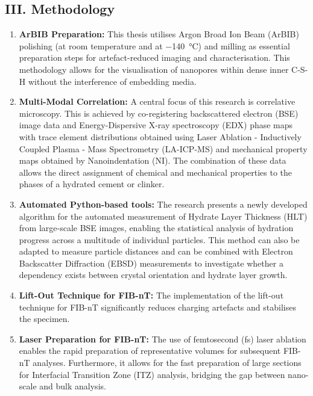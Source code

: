 \documentclass[11pt, a4paper]{article}
\begin{document}
\subsection*{III. Methodology}

\begin{enumerate}[label=\textbf{\arabic*.}, leftmargin=1.5cm, labelsep=0.5cm, itemsep=0.5em, resume]
    \item \textbf{ArBIB Preparation:} This thesis utilises Argon Broad Ion Beam (ArBIB) polishing (at room temperature and at \qty{-140}{\celsius}) and milling as essential preparation steps for artefact-reduced imaging and characterisation.
    This methodology allows for the visualisation of nanopores within dense inner C-S-H without the interference of embedding media.
    \item \textbf{Multi-Modal Correlation:} A central focus of this research is correlative microscopy.
    This is achieved by co-registering backscattered electron (BSE) image data and Energy-Dispersive X-ray spectroscopy (EDX) phase maps with trace element distributions obtained using Laser Ablation - Inductively Coupled Plasma - Mass Spectrometry (LA-ICP-MS) and mechanical property maps obtained by Nanoindentation (NI).
    The combination of these data allows the direct assignment of chemical and mechanical properties to the phases of a hydrated cement or clinker.
    \item \textbf{Automated Python-based tools:} The research presents a newly developed algorithm for the automated measurement of Hydrate Layer Thickness (HLT) from large-scale BSE images, enabling the statistical analysis of hydration progress across a multitude of individual particles.
    This method can also be adapted to measure particle distances and can be combined with Electron Backscatter Diffraction (EBSD) measurements to investigate whether a dependency exists between crystal orientation and hydrate layer growth.
    \item \textbf{Lift-Out Technique for FIB-nT:} The implementation of the lift-out technique for FIB-nT significantly reduces charging artefacts and stabilises the specimen.
    \item \textbf{Laser Preparation for FIB-nT:} The use of femtosecond (fs) laser ablation enables the rapid preparation of representative volumes for subsequent FIB-nT analyses.
    Furthermore, it allows for the fast preparation of large sections for Interfacial Transition Zone (ITZ) analysis, bridging the gap between nano-scale and bulk analysis.
\end{enumerate}
\end{document}
